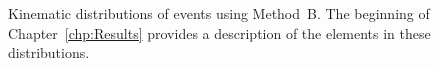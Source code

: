 \begin{figure}[h!]
{\label{fig:pjMtdBSetOne:Mass_pj1}
}
\caption{Kinematic distributions of \phoonejet events using \mbox{Method B}. The beginning of Chapter~\ref{chp:Results} provides a description of the elements in these distributions.}
\label{fig:pjMtdBSetOne}
\end{figure}
\clearpage

\begin{figure}[h!]
\centering
{}
\subfigure[]

\end{figure}
